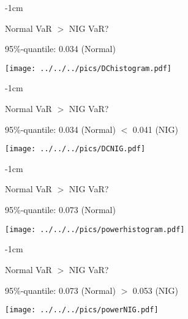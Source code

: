 {-1cm}
\begin{center}
Normal VaR $>$ NIG VaR?
\end{center}
95\%-quantile: \hspace{2cm} 0.034 (Normal) \hspace{1cm}\\
\begin{center}
\texttt{[image: ../../../pics/DChistogram.pdf]}
\end{center}


{-1cm}
\begin{center}
Normal VaR $>$ NIG VaR?
\end{center}
95\%-quantile: \hspace{1cm} 0.034 (Normal)  \hspace{1cm}$<$ \hspace{1cm} 0.041 (NIG)\\
\begin{center}
\texttt{[image: ../../../pics/DCNIG.pdf]}
\end{center}


{-1cm}
\begin{center}
Normal VaR $>$ NIG VaR?
\end{center}
95\%-quantile: \hspace{1cm} 0.073 (Normal) \hspace{1cm} \\
\begin{center}
\texttt{[image: ../../../pics/powerhistogram.pdf]}
\end{center}


{-1cm}
\begin{center}
Normal VaR $>$ NIG VaR?
\end{center}
95\%-quantile: \hspace{1cm} 0.073 (Normal) \hspace{1cm}$>$ \hspace{1cm} 0.053 (NIG) \\
\begin{center}
\texttt{[image: ../../../pics/powerNIG.pdf]}
\end{center}

